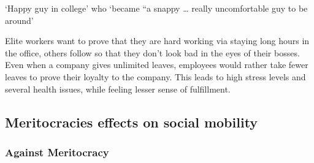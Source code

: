 \documentclass[11pt]{article}
\begin{document}
‘Happy guy in college’ who ‘became “a snappy … really uncomfortable guy to be around’

Elite workers want to prove that they are hard working via staying long hours in the office, others follow so that they don’t look bad in the eyes of their bosses. Even when a company gives unlimited leaves, employees would rather take fewer leaves to prove their loyalty to the company. This leads to high stress levels and several health issues, while feeling lesser sense of fulfillment.
\subsection{Meritocracies effects on social mobility}
\subsubsection{Against Meritocracy}
\end{document}
